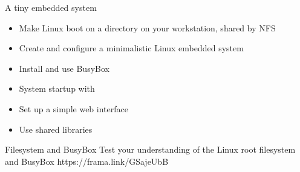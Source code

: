 \setuplabframe
{A tiny embedded system}
{
  \begin{itemize}
  \item Make Linux boot on a directory on your workstation, shared by NFS
  \item Create and configure a minimalistic Linux embedded system
  \item Install and use BusyBox
  \item System startup with 
  \item Set up a simple web interface
  \item Use shared libraries
  \end{itemize}
}

\quizframe
{Filesystem and BusyBox}
{Test your understanding of the Linux root filesystem and BusyBox}
{https://frama.link/GSajeUbB}

